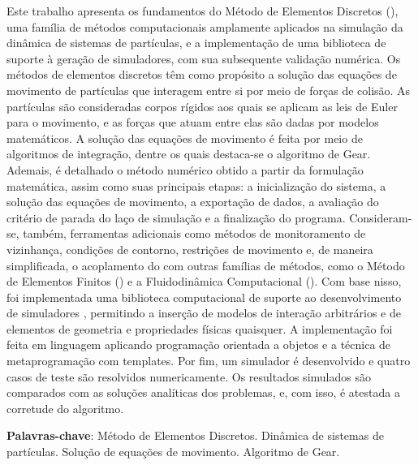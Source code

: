 \setlength{\absparsep}{18pt} %
\begin{resumo}
	Este trabalho apresenta os fundamentos do Método de Elementos Discretos (\DEM{}), uma família de métodos computacionais amplamente aplicados na simulação da dinâmica de sistemas de partículas, e a implementação de uma biblioteca de suporte à geração de simuladores, com sua subsequente validação numérica. Os métodos de elementos discretos têm como propósito a solução das equações de movimento de partículas que interagem entre si por meio de forças de colisão. As partículas são consideradas corpos rígidos aos quais se aplicam as leis de Euler para o movimento, e as forças que atuam entre elas são dadas por modelos matemáticos. A solução das equações de movimento é feita por meio de algoritmos de integração, dentre os quais destaca-se o algoritmo de Gear. Ademais, é detalhado o método numérico obtido a partir da formulação matemática, assim como suas principais etapas: a inicialização do sistema, a solução das equações de movimento, a exportação de dados, a avaliação do critério de parada do laço de simulação e a finalização do programa. Consideram-se, também, ferramentas adicionais como métodos de monitoramento de vizinhança, condições de contorno, restrições de movimento e, de maneira simplificada, o acoplamento do \DEM{} com outras famílias de métodos, como o Método de Elementos Finitos (\FEM{}) e a Fluidodinâmica Computacional (\CFD{}). Com base nisso, foi implementada uma biblioteca computacional de suporte ao desenvolvimento de simuladores \DEM{}, permitindo a inserção de modelos de interação arbitrários e de elementos de geometria e propriedades físicas quaisquer. A implementação foi feita em linguagem \CPP{} aplicando programação orientada a objetos e a técnica de metaprogramação com templates. Por fim, um simulador é desenvolvido e quatro casos de teste são resolvidos numericamente. Os resultados simulados são comparados com as soluções analíticas dos problemas, e, com isso, é atestada a corretude do algoritmo.

   \vspace{\onelineskip}
 
   \noindent 
   \textbf{Palavras-chave}: Método de Elementos Discretos. Dinâmica de sistemas de partículas. Solução de equações de movimento. Algoritmo de Gear.
\end{resumo}


